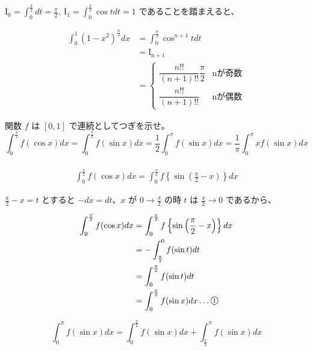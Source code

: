 \documentclass[a4j]{jsarticle}
\newcommand{\ctext}[1]{\raise0.2ex\hbox{\textcircled{\scriptsize{#1}}}} %
\begin{document}
    $\displaystyle \mathrm{I_0} = \int_{0}^{\frac{\pi}{2}}dt = \frac{\pi}{2}, \: \mathrm{I_1} = \int_{0}^{\frac{\pi}{2}} \cos tdt = 1$ であることを踏まえると、

    \begin{align*}
        \int_{0}^{1} \left(1 - x^2\right)^{\frac{n}{2}}dx &= \int_{0}^{\frac{\pi}{2}} \cos^{n + 1}tdt \\
        &= \mathrm{I_{n + 1}} \\
        &=
        \begin{cases}
          \dfrac{n!!}{(n + 1)!!}\dfrac{\pi}{2} & \mathrm{nが奇数} \\
          \dfrac{n!!}{(n + 1)!!} & \mathrm{nが偶数}
        \end{cases}
    \end{align*}

    関数 $\displaystyle f$ は $\displaystyle \left[0, 1\right]$ で連続としてつぎを示せ。
    \begin{equation*}
        \int_{0}^{\frac{\pi}{2}} f(\cos x)dx = \int_{0}^{\frac{\pi}{2}} f(\sin x)dx = \frac{1}{2} \int_{0}^{\pi}f(\sin x)dx = \frac{1}{\pi} \int_{0}^{\pi}xf(\sin x)dx
    \end{equation*} \\

    \begin{align*}
        \int_{0}^{\frac{\pi}{2}} f(\cos x)dx = \int_{0}^{\frac{\pi}{2}} f \left\{ \sin \left(\frac{\pi}{2} - x\right) \right\} dx
    \end{align*}

    $\displaystyle \frac{\pi}{2} - x = t$ とすると $\displaystyle -dx = dt$、$\displaystyle x$ が $\displaystyle 0 \rightarrow \frac{\pi}{2}$ の時 $\displaystyle t$ は $\displaystyle \frac{\pi}{2} \rightarrow 0$ であるから、

    \begin{align*}
        \int_{0}^{\frac{\pi}{2}} f(\cos x)dx &= \int_{0}^{\frac{\pi}{2}} f \left\{ \sin \left(\frac{\pi}{2} - x\right) \right\} dx \\
        &= -\int_{\frac{\pi}{2}}^{0} f(\sin t) dt \\
        &= \int_{0}^{\frac{\pi}{2}} f(\sin t)dt \\
        &= \int_{0}^{\frac{\pi}{2}} f(\sin x)dx \dots \ctext{1}
    \end{align*}

    \begin{equation*}
        \int_{0}^{\pi} f(\sin x)dx = \int_{0}^{\frac{\pi}{2}} f(\sin x)dx + \int_{\frac{\pi}{2}}^{\pi} f(\sin x)dx
    \end{equation*}
\end{document}
